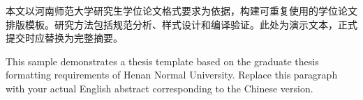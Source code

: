 \documentclass[science]{hnnuthesis}
\newif\ifblindreview
\begin{document}
\hnnumakecover
\hnnutitlepage
\hnnufrontmatter

\begin{hnnuabstract}
本文以河南师范大学研究生学位论文格式要求为依据，构建可重复使用的学位论文排版模板。研究方法包括规范分析、样式设计和编译验证。此处为演示文本，正式提交时应替换为完整摘要。
\end{hnnuabstract}

\begin{hnnuenglishabstract}
This sample demonstrates a thesis template based on the graduate thesis formatting requirements of Henan Normal University. Replace this paragraph with your actual English abstract corresponding to the Chinese version.
\end{hnnuenglishabstract}

\cleardoublepage
{}
{}
\hnnutableofcontents
\hnnumainmatter








\cleardoublepage
{}
{}


\ifblindreview
\else
  \appendix


  \hnnudeclarations

\fi
\end{document}
